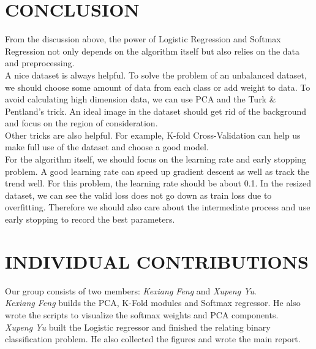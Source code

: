 \documentclass{article} %
\begin{document}
\section {CONCLUSION}
From the discussion above, the power of Logistic Regression and Softmax Regression not only depends on the algorithm itself but also relies on the data and preprocessing.\\
A nice dataset is always helpful. To solve the problem of an unbalanced dataset, we should choose some amount of data from each class or add weight to data. To avoid calculating high dimension data, we can use PCA and the Turk \& Pentland's trick. An ideal image in the dataset should get rid of the background and focus on the region of consideration.\\
Other tricks are also helpful. For example, K-fold Cross-Validation can help us make full use of the dataset and choose a good model.\\
For the algorithm itself, we should focus on the learning rate and early stopping problem. A good learning rate can speed up gradient descent as well as track the trend well. For this problem, the learning rate should be about 0.1. In the resized dataset, we can see the valid loss does not go down as train loss due to overfitting. Therefore we should also care about the intermediate process and use early stopping to record the best parameters.
\section{INDIVIDUAL CONTRIBUTIONS}
Our group consists of two members: \textit{Kexiang Feng} and \textit{Xupeng Yu}. \\
\textit{Kexiang Feng} builds the PCA, K-Fold modules and Softmax regressor. He also wrote the scripts to visualize the softmax weights and PCA components. \\
\textit{Xupeng Yu} built the Logistic regressor and finished the relating binary classification problem. He also collected the figures and wrote the main report. 




\end{document}
